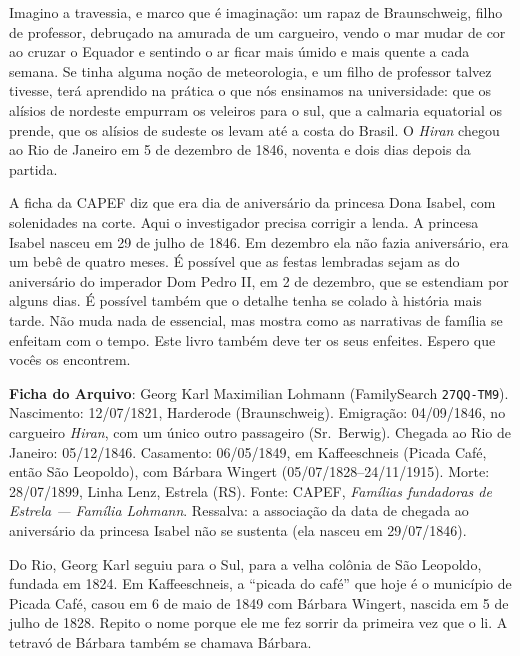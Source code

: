 \documentclass[
  brazilian,
  11pt,
  openany]{book}
\begin{document}
Imagino a travessia, e marco que é imaginação: um rapaz de Braunschweig,
filho de professor, debruçado na amurada de um cargueiro, vendo o mar
mudar de cor ao cruzar o Equador e sentindo o ar ficar mais úmido e mais
quente a cada semana. Se tinha alguma noção de meteorologia, e um filho
de professor talvez tivesse, terá aprendido na prática o que nós
ensinamos na universidade: que os alísios de nordeste empurram os
veleiros para o sul, que a calmaria equatorial os prende, que os alísios
de sudeste os levam até a costa do Brasil. O \emph{Hiran} chegou ao Rio
de Janeiro em 5 de dezembro de 1846, noventa e dois dias depois da
partida.

A ficha da CAPEF diz que era dia de aniversário da princesa Dona Isabel,
com solenidades na corte. Aqui o investigador precisa corrigir a lenda.
A princesa Isabel nasceu em 29 de julho de 1846. Em dezembro ela não
fazia aniversário, era um bebê de quatro meses. É possível que as festas
lembradas sejam as do aniversário do imperador Dom Pedro II, em 2 de
dezembro, que se estendiam por alguns dias. É possível também que o
detalhe tenha se colado à história mais tarde. Não muda nada de
essencial, mas mostra como as narrativas de família se enfeitam com o
tempo. Este livro também deve ter os seus enfeites. Espero que vocês os
encontrem.

\begin{ficha}

\textbf{Ficha do Arquivo}: Georg Karl Maximilian Lohmann (FamilySearch
\texttt{27QQ-TM9}). Nascimento: 12/07/1821, Harderode (Braunschweig).
Emigração: 04/09/1846, no cargueiro \emph{Hiran}, com um único outro
passageiro (Sr.~Berwig). Chegada ao Rio de Janeiro: 05/12/1846.
Casamento: 06/05/1849, em Kaffeeschneis (Picada Café, então São
Leopoldo), com Bárbara Wingert (05/07/1828--24/11/1915). Morte:
28/07/1899, Linha Lenz, Estrela (RS). Fonte: CAPEF, \emph{Famílias
fundadoras de Estrela --- Família Lohmann}. Ressalva: a associação da
data de chegada ao aniversário da princesa Isabel não se sustenta (ela
nasceu em 29/07/1846).

\end{ficha}

Do Rio, Georg Karl seguiu para o Sul, para a velha colônia de São
Leopoldo, fundada em 1824. Em Kaffeeschneis, a ``picada do café'' que
hoje é o município de Picada Café, casou em 6 de maio de 1849 com
Bárbara Wingert, nascida em 5 de julho de 1828. Repito o nome porque ele
me fez sorrir da primeira vez que o li. A tetravó de Bárbara também se
chamava Bárbara.
\end{document}
